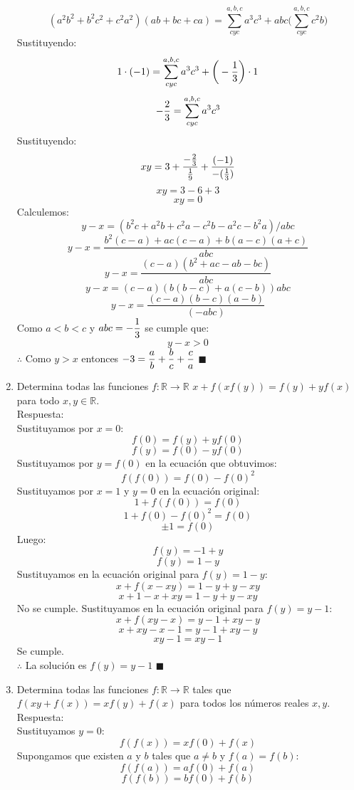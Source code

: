 \documentclass{book}
\newcommand{\R}{\mathbb{R}} \newcommand{\N}{\mathbb{N}}
\begin{document}
\begin{enumerate}
          $$(a^2 b^2+b^2 c^2+c^2 a^2 )(ab+bc+ca)=\sum_{cyc}^{a,b,c}a^3 c^3+abc\bigg(\sum_{cyc}^{a,b,c}c^2 b \bigg)$$
          Sustituyendo:
          $$1\cdot(-1)=\sum_{cyc}^{a,b,c}a^3 c^3 +\bigg(-{1\over 3}\bigg)\cdot 1$$
          $$-{2\over 3}=\sum_{cyc}^{a,b,c}a^3 c^3$$
          Sustituyendo:
          $$xy=3+\frac{-{2\over 3}}{{1\over 9}}+{(-1)\over-({1\over 3})}$$
          $$xy=3-6+3$$
          $$xy=0$$
          Calculemos:
          $$y-x=(b^2 c+a^2 b+c^2 a-c^2 b-a^2 c-b^2 a)/abc$$
          $$y-x=\frac{b^2 (c-a)+ac(c-a)+b(a-c)(a+c)}{abc}$$
          $$y-x=\frac{(c-a)(b^2+ac-ab-bc)}{abc}$$
          $$y-x={(c-a)(b(b-c)+a(c-b))}{abc}$$
          $$y-x=\frac{(c-a)(b-c)(a-b)}{(-abc)}$$
          Como $a<b<c$ y  $\displaystyle{abc=-{1\over 3}}$ se cumple que:
          $$y-x>0$$
          $\therefore$ Como $y>x$ entonces $\displaystyle{-3={a\over b}+{b\over c}+{c\over a}}$ $\blacksquare$\\
    \item Determina todas las funciones $f:\R\rightarrow\R$ $x + f(xf(y))=f(y) + yf(x)$ para todo $x,y\in\R$.\\
          Respuesta:\\
          Sustituyamos por $x=0$:
          $$f(0) = f(y)+ yf(0)$$
          $$f(y)=f(0)- yf(0)$$
          Sustituyamos por $y=f(0)$ en la ecuación que obtuvimos:
          $$f(f(0))=f(0)-{f(0)}^2$$
          Sustituyamos por $x=1$ y $y=0$ en la ecuación original:
          $$1+ f(f(0)) = f(0)$$
          $$1+ f(0)-{f(0)}^2= f(0)$$
          $$\pm 1= f(0)$$
          Luego:
          $$f(y)=-1+ y$$
          $$f(y)=1- y$$
          Sustituyamos en la ecuación original para $f(y)=1- y$:
          $$x+ f(x-xy)= 1-y+y-xy$$
          $$x+1-x+xy= 1-y+y-xy$$
          No se cumple.
          Sustituyamos en la ecuación original para $f(y)=y- 1$:
          $$x+ f(xy-x)= y-1+xy-y$$
          $$x+xy-x-1= y-1+xy-y$$
          $$xy-1=xy-1$$
          Se cumple.\\
          $\therefore$ La solución es $f(y)=y-1 $ $\blacksquare$\\
    \item Determina todas las funciones $f:\R\rightarrow\R$ tales que $f(xy + f(x)) = xf(y) + f(x)$ para todos los números reales $x,y$.\\
          Respuesta:\\
          Sustituyamos $y=0$:
          $$f( f(x)) = xf(0)+ f(x)$$
          Supongamos que existen $a$ y $b$ tales que $a\neq b$ y $f(a)=f(b)$:
          $$f( f(a)) = af(0)+ f(a)$$
          $$f( f(b)) = bf(0)+ f(b)$$

\end{enumerate}
\end{document}
